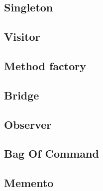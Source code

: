 \documentclass{article}
\begin{document}
\subsection{Singleton}

\subsection{Visitor}

\subsection{Method factory}

\subsection{Bridge}

\subsection{Observer}

\subsection{Bag Of Command}

\subsection{Memento}
\end{document}
